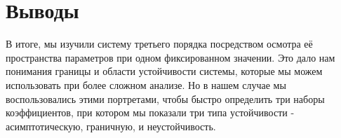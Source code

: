 \section{Выводы}
В итоге, мы изучили систему третьего порядка посредством осмотра её пространства параметров при одном фиксированном значении. Это дало нам понимания границы и области устойчивости системы, которые мы можем использовать при более сложном анализе. 
Но в нашем случае мы воспользовались этими портретами, чтобы быстро определить три наборы коэффициентов, при котором мы показали три типа устойчивости - асимптотическую, граничную, и неустойчивость.



\endinput